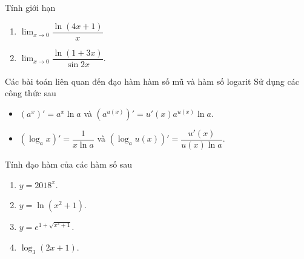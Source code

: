 \begin{vd}%
Tính giới hạn 
\begin{enumerate}
        \item $\displaystyle \lim_{x \to 0} \dfrac{\ln(4x+1)}{x}$ 
        \item $\displaystyle \lim_{x \to 0}\dfrac{\ln(1+3x)}{\sin 2x}$.
    \end{enumerate}
\end{vd}
\begin{dang}{Các bài toán liên quan đến đạo hàm hàm số mũ và hàm số logarit}
Sử dụng các công thức sau
\begin{itemize}
\item $(a^x)'=a^x \ln a$ và $\left(a^{u(x)}\right)'=u'(x) a^{u(x)} \ln a$.
\item $\left(\log_a x\right)'=\dfrac{1}{x \ln a}$ và $\left(\log_a u(x) \right)'=\dfrac{u'(x)}{u(x) \ln a}$.
\end{itemize}
\end{dang}
\begin{vd}%
Tính đạo hàm của các hàm số sau
\begin{enumerate}
        \item $y=2018^x$. 
        \item $y=\ln \left(x^2+1\right)$.
        \item $y=e^{1+\sqrt{x^2+1}}$.
        \item $\log_3(2x+1)$.
    \end{enumerate}
\end{vd}

